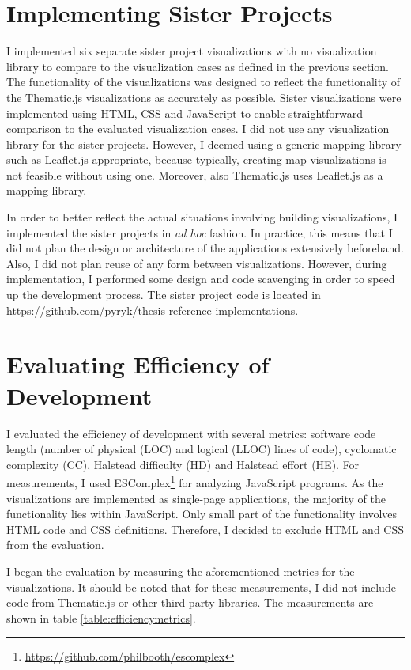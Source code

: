 \section{Implementing Sister Projects}

I implemented six separate sister project visualizations with no visualization library to compare to the visualization cases as defined in the previous section. The functionality of the visualizations was designed to reflect the functionality of the Thematic.js visualizations as accurately as possible. Sister visualizations were implemented using HTML, CSS and JavaScript to enable straightforward comparison to the evaluated visualization cases. I did not use any visualization library for the sister projects. However, I deemed using a generic mapping library such as Leaflet.js appropriate, because typically, creating map visualizations is not feasible without using one. Moreover, also Thematic.js uses Leaflet.js as a mapping library.

In order to better reflect the actual situations involving building visualizations, I implemented the sister projects in \emph{ad hoc} fashion. In practice, this means that I did not plan the design or architecture of the applications extensively beforehand. Also, I did not plan reuse of any form between visualizations. However, during implementation, I performed some design and code scavenging in order to speed up the development process. The sister project code is located in \url{https://github.com/pyryk/thesis-reference-implementations}.

\section{Evaluating Efficiency of Development}
\label{section:evaluatingefficiency}

I evaluated the efficiency of development with several metrics: software code length (number of physical (LOC) and logical (LLOC) lines of code), cyclomatic complexity (CC), Halstead difficulty (HD) and Halstead effort (HE). For measurements, I used ESComplex\footnote{\url{https://github.com/philbooth/escomplex}} for analyzing JavaScript programs. As the visualizations are implemented as single-page applications, the majority of the functionality lies within JavaScript. Only small part of the functionality involves HTML code and CSS definitions. Therefore, I decided to exclude HTML and CSS from the evaluation.

I began the evaluation by measuring the aforementioned metrics for the visualizations. It should be noted that for these measurements, I did not include code from Thematic.js or other third party libraries. The measurements are shown in table \ref{table:efficiencymetrics}.

